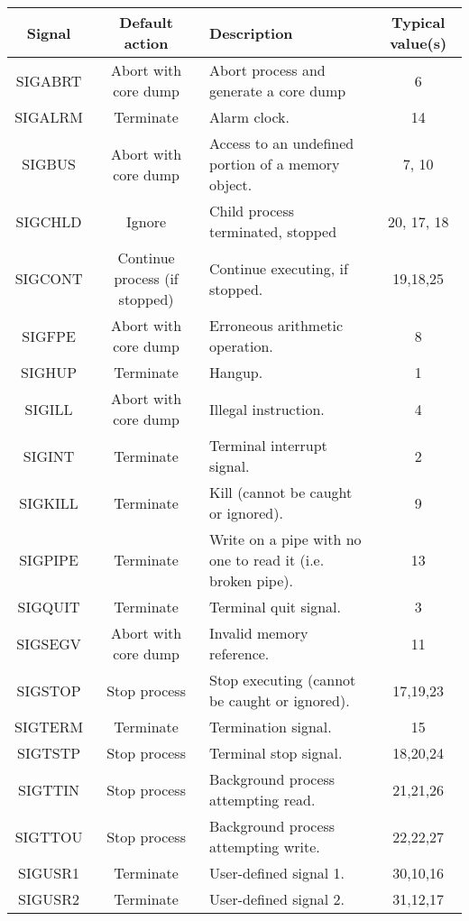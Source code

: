 \begin{table*}[H]
	\begin{tabular}{|c|c|p{5cm}|c|}
		\hline
		\textbf{ Signal} & \textbf{ Default action} & \textbf{ Description} & \textbf{ Typical value(s)} \\ \hline
		 SIGABRT &  Abort with core dump &  Abort process and generate a core dump &  6 \\ \hline
		 SIGALRM &  Terminate &  Alarm clock. &  14 \\ \hline
		 SIGBUS &  Abort with core dump &  Access to an undefined portion of a memory object. &  7, 10 \\ \hline
		 SIGCHLD &  Ignore &  Child process terminated, stopped &  20, 17, 18 \\ \hline
		 SIGCONT &  Continue process (if stopped) &  Continue executing, if stopped. &  19,18,25 \\ \hline
		 SIGFPE &  Abort with core dump &  Erroneous arithmetic operation. &  8 \\ \hline
		 SIGHUP &  Terminate &  Hangup. &  1 \\ \hline
		 SIGILL &  Abort with core dump &  Illegal instruction. &  4 \\ \hline
		 SIGINT &  Terminate &  Terminal interrupt signal. &  2 \\ \hline
		 SIGKILL &  Terminate &  Kill (cannot be caught or ignored). &  9 \\ \hline
		 SIGPIPE &  Terminate &  Write on a pipe with no one to read it (i.e. broken pipe). &  13 \\ \hline
		 SIGQUIT &  Terminate &  Terminal quit signal. &  3 \\ \hline
		 SIGSEGV &  Abort with core dump &  Invalid memory reference. &  11 \\ \hline
		 SIGSTOP &  Stop process &  Stop executing (cannot be caught or ignored). &  17,19,23 \\ \hline
		 SIGTERM &  Terminate &  Termination signal. &  15 \\ \hline
		 SIGTSTP &  Stop process &  Terminal stop signal. &  18,20,24 \\ \hline
		 SIGTTIN &  Stop process &  Background process attempting read. &  21,21,26 \\ \hline
		 SIGTTOU &  Stop process &  Background process attempting write. &  22,22,27 \\ \hline
		 SIGUSR1 &  Terminate &  User-defined signal 1. &  30,10,16 \\ \hline
		 SIGUSR2 &  Terminate &  User-defined signal 2. &  31,12,17 \\ \hline

\end{tabular}
\end{table*}
